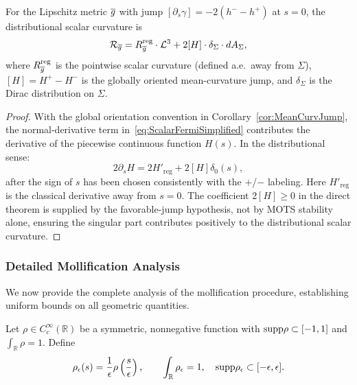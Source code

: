 \begin{theorem}
\label{thm:DistributionalCurvature}
For the Lipschitz metric $\overline{g}$ with jump $[\partial_s \gamma] = -2(h^- - h^+)$ at $s = 0$, the distributional scalar curvature is
\begin{equation}
\label{eq:DistributionalScalar}
\mathcal{R}_{\overline{g}} = R^{\mathrm{reg}}_{\overline{g}} \cdot \mathcal{L}^3 + 2[H] \cdot \delta_\Sigma \cdot dA_\Sigma,
\end{equation}
where $R^{\mathrm{reg}}_{\overline{g}}$ is the pointwise scalar curvature (defined a.e.\ away from $\Sigma$), $[H]=H^+-H^-$ is the globally oriented mean-curvature jump, and $\delta_\Sigma$ is the Dirac distribution on $\Sigma$.
\end{theorem}

\begin{proof}
With the global orientation convention in Corollary~\ref{cor:MeanCurvJump}, the normal-derivative term in~\eqref{eq:ScalarFermiSimplified} contributes the derivative of the piecewise continuous function \(H(s)\). In the distributional sense:
\[
2 \partial_s H = 2 H'_{\mathrm{reg}} + 2[H] \delta_0(s),
\]
after the sign of \(s\) has been chosen consistently with the \(+\)/\(-\) labeling. Here $H'_{\mathrm{reg}}$ is the classical derivative away from $s = 0$. The coefficient $2[H] \ge 0$ in the direct theorem is supplied by the favorable-jump hypothesis, not by MOTS stability alone, ensuring the singular part contributes positively to the distributional scalar curvature.
\end{proof}

\subsubsection{Detailed Mollification Analysis}

We now provide the complete analysis of the mollification procedure, establishing uniform bounds on all geometric quantities.

\begin{definition}
Let $\rho \in C^\infty_c(\mathbb{R})$ be a symmetric, nonnegative function with $\mathrm{supp} \rho \subset [-1, 1]$ and $\int_\mathbb{R} \rho = 1$. Define
\[
\rho_\epsilon(s) = \frac{1}{\epsilon} \rho\left( \frac{s}{\epsilon} \right), \qquad \int_\mathbb{R} \rho_\epsilon = 1, \quad \mathrm{supp} \rho_\epsilon \subset [-\epsilon, \epsilon].
\]
\end{definition}

